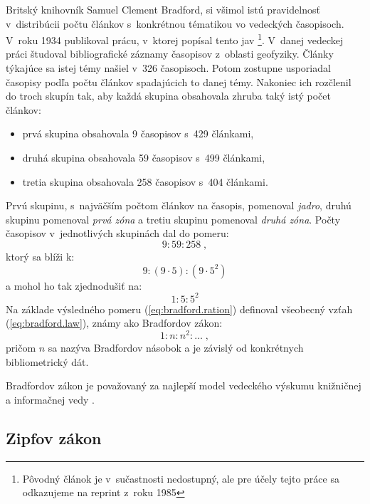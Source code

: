 Britský knihovník Samuel Clement Bradford, si všimol istú pravidelnosť
v~distribúcii počtu článkov s~konkrétnou tématikou vo vedeckých časopisoch.
V~roku 1934 publikoval prácu, v~ktorej popísal tento jav
\citep{Bradford1985}\footnote{Pôvodný článok je v~sučastnosti nedostupný, ale
pre účely tejto práce sa odkazujeme na reprint z~roku 1985}.  V~danej vedeckej
práci študoval bibliografické záznamy časopisov z~oblasti geofyziky.  Články
týkajúce sa istej témy našiel v~326 časopisoch.  Potom zostupne usporiadal
časopisy podľa počtu článkov spadajúcich to danej témy.  Nakoniec ich rozčlenil
do troch skupín tak, aby každá skupina obsahovala zhruba taký istý počet
článkov:

\begin{itemize}
\item prvá skupina obsahovala 9 časopisov s~429 článkami,
\item druhá skupina obsahovala 59 časopisov s~499 článkami,
\item tretia skupina obsahovala 258 časopisov s~404 článkami.
\end{itemize}
Prvú skupinu, s~najväčším počtom článkov na časopis, pomenoval \emph{jadro},
druhú skupinu pomenoval \emph{prvá zóna} a tretiu skupinu pomenoval \emph{druhá
  zóna}.  Počty časopisov v~jednotlivých skupinách dal do pomeru:
\begin{equation*}
9 : 59 : 258 \;,
\end{equation*}
ktorý sa blíži k:
\begin{equation*}
9 : (9 \cdot 5) : (9 \cdot 5^2)
\end{equation*}
a mohol ho tak zjednodušiť na:
\begin{equation}
\label{eq:bradford.ration}
1 : 5 : 5^2
\end{equation}
Na základe výsledného pomeru (\ref{eq:bradford.ration}) definoval všeobecný
vzťah (\ref{eq:bradford.law}), známy ako Bradfordov zákon:
\begin{equation}
\label{eq:bradford.law}
1 : n : n^2 : \dotso \;,
\end{equation}
pričom $n$ sa nazýva Bradfordov násobok a je závislý od konkrétnych
bibliometrický dát.

Bradfordov zákon je považovaný za najlepší model vedeckého výskumu knižničnej a
informačnej vedy \citep[napr.][]{Nicolaisen2007}.


\subsection{Zipfov zákon}

